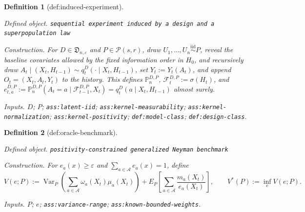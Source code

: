 \documentclass{article}
\newtheorem{definition}{Definition}
\begin{document}
\begin{definition}[def:induced-experiment]\label{def:induced-experiment}
\par\smallskip\noindent\emph{Defined object.} \texttt{sequential experiment induced by a design and a superpopulation law}
\par\smallskip\noindent\emph{Construction.} For \(D\in\mathfrak D_{n,\varepsilon}\) and \(P\in\mathcal P(s,r)\), draw \(U_1,\ldots,U_n\stackrel{\mathrm{iid}}{\sim}P\), reveal the baseline covariates allowed by the fixed information order in \(H_0\), and recursively draw \(A_t\mid(X_t,H_{t-1})\sim q_t^D(\cdot\mid X_t,H_{t-1})\), set \(Y_t:=Y_t(A_t)\), and append \(O_t=(X_t,A_t,Y_t)\) to the history. This defines \(\mathbb P_n^{D,P}\), \(\mathcal F_t^{D,P}:=\sigma(H_t)\), and \(e_{t,a}^{D,P}:=\mathbb P_n^{D,P}(A_t=a\mid\mathcal F_{t-1}^{D,P},X_t)=q_t^D(a\mid X_t,H_{t-1})\) almost surely.
\par\smallskip\noindent\emph{Inputs.} \(D\); \(P\); \texttt{ass:\allowbreak{}latent-\allowbreak{}iid}; \texttt{ass:\allowbreak{}kernel-\allowbreak{}measurability}; \texttt{ass:\allowbreak{}kernel-\allowbreak{}normalization}; \texttt{ass:\allowbreak{}kernel-\allowbreak{}positivity}; \texttt{def:\allowbreak{}model-\allowbreak{}class}; \texttt{def:\allowbreak{}design-\allowbreak{}class}.
\end{definition}

\begin{definition}[def:oracle-benchmark]\label{def:oracle-benchmark}
\par\smallskip\noindent\emph{Defined object.} \texttt{positivity-\allowbreak{}constrained generalized Neyman benchmark}
\par\smallskip\noindent\emph{Construction.} For \(e_a(x)\ge\varepsilon\) and \(\sum_{a\in\mathcal A}e_a(x)=1\), define \[V(e;P):=\operatorname{Var}_P\!\left(\sum_{a\in\mathcal A}\omega_a(X_t)\mu_a(X_t)\right)+E_P\!\left[\sum_{a\in\mathcal A}\frac{m_a(X_t)}{e_a(X_t)}\right],\qquad V^*(P):=\inf_e V(e;P).\]
\par\smallskip\noindent\emph{Inputs.} \(P\); \(e\); \texttt{ass:\allowbreak{}variance-\allowbreak{}range}; \texttt{ass:\allowbreak{}known-\allowbreak{}bounded-\allowbreak{}weights}.
\end{definition}
\end{document}
